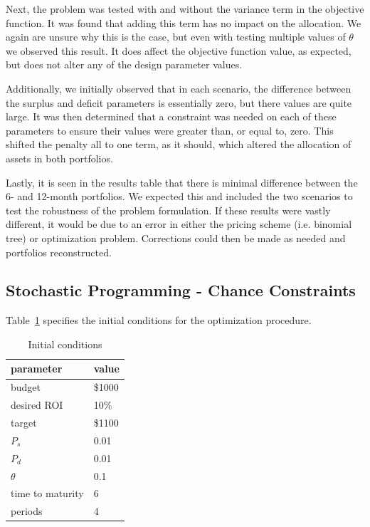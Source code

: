 \documentclass[12pt]{article}
\begin{document}
	Next, the problem was tested with and without the variance term in the objective function. It was found that adding this term has no impact on the allocation. We again are unsure why this is the case, but even with testing multiple values of $\theta$ we observed this result. It does affect the objective function value, as expected, but does not alter any of the design parameter values.
	
	Additionally, we initially observed that in each scenario, the difference between the surplus and deficit parameters is essentially zero, but there values are quite large. It was then determined that a constraint was needed on each of these parameters to ensure their values were greater than, or equal to, zero. This shifted the penalty all to one term, as it should, which altered the allocation of assets in both portfolios.
	
	Lastly, it is seen in the results table that there is minimal difference between the 6- and 12-month portfolios. We expected this and included the two scenarios to test the robustness of the problem formulation. If these results were vastly different, it would be due to an error in either the pricing scheme (i.e. binomial tree) or optimization problem. Corrections could then be made as needed and portfolios reconstructed.

\subsection{Stochastic Programming - Chance Constraints}
Table~\ref{tab:init_cond2} specifies the initial conditions for the optimization procedure.
\begin{table}[H]
	\centering
    \begin{tabular}{|l|l|}
    \hline
    	\textbf{parameter} & \textbf{value} \\ \hline
    	budget & \$1000 \\ \hline
	desired ROI & 10\% \\ \hline
	target & \$1100 \\ \hline
	$P_s$ & 0.01 \\ \hline
	$P_d$ & 0.01 \\ \hline
	$\theta$ & 0.1 \\ \hline
	time to maturity & 6\\ \hline
	periods & 4 \\ \hline
    \end{tabular}
    \caption {Initial conditions}
    \label{tab:init_cond2}
\end{table}
\end{document}
